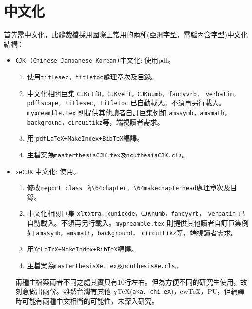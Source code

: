\section{中文化}
首先需中文化，此體裁檔採用國際上常用的兩種(亞洲字型，電腦內含字型)中文化結構：
\begin{itemize}
\item {\tt CJK (Chinese Janpanese Korean)}中文化: 使用pdf。 
\begin{enumerate}
\item 使用{\tt titlesec, titletoc}處理章次及目錄。
\item 中文化相關巨集
{\tt CJKutf8，CJKvert，CJKnumb, fancyvrb}，
{\tt verbatim, pdflscape, titlesec, titletoc} 已自動載入。不須再另行載入。
{\tt mypreamble.tex} 則提供其他讀者自訂巨集例如 
{\tt amssymb}，{\tt amsmath，background，circuitikz}等，端視讀者需求。


\item 用 {\tt pdfLaTeX+MakeIndex+BibTeX}編譯。
\item 主檔案為{\tt masterthesis{\color{red}CJK.tex}及ncuthesis{\color{red}CJK}.cls}。
\end{enumerate}

\item {\tt xeCJK} 中文化: 使用。
\begin{enumerate}

\item 修改{\tt report class 內\textbackslash\char64chapter, \textbackslash\char64makechapterhead}處理章次及目錄。

\item 中文化相關巨集 
{\tt xltxtra，xunicode，CJKnumb，fancyvrb}，
{\tt verbatim} 已自動載入。不須再另行載入。{\tt mypreamble.tex} 則提供其他讀者自訂巨集例如
{\tt amssymb，amsmath}，{\tt background}，
{\tt circuitikz}等，端視讀者需求。

\item 用{\tt XeLaTeX+MakeIndex+BibTeX}編譯。
\item 主檔案為{\tt masterthesis{\color{red}Xe.tex}及ncuthesis{\color{red}Xe}.cls}。
\end{enumerate}
兩種主檔案兩者不同之處其實只有10行左右。但為方便不同的研究生使用，故刻意做出兩份。雖然台灣有其他 $\chi$\TeX({\tt aka. chi\TeX})，cw\TeX，PU，但編譯時可能有兩種中文相衝的可能性，未深入研究。
\end{itemize}

